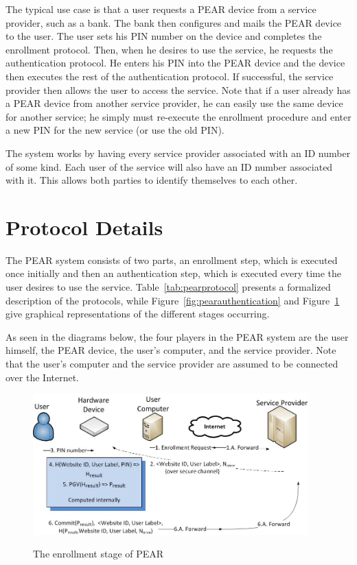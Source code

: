 The typical use case is that a user requests a PEAR device from a service provider, such as a bank. The bank then configures
and mails the PEAR device to the user. The user sets his PIN number on the device and completes the enrollment protocol.
Then, when he desires to use the service, he requests the authentication protocol. He enters his PIN into the PEAR device
and the device then executes the rest of the authentication protocol. If successful, the service provider then allows
the user to access the service. 
Note that if a user already has a PEAR device from another service provider, he can easily use the same device for another
service; he simply must re-execute the enrollment procedure and enter a new PIN for the new service (or use the old PIN).

The system works by having every service provider associated with an ID number of some kind. Each user of the service will
also have an ID number associated with it. This allows both parties to identify themselves to each other.

\section{Protocol Details}
The PEAR system consists of two parts, an enrollment step, which is executed once initially and then an authentication step,
which is executed every time the user desires to use the service.
Table~\ref{tab:pearprotocol} presents a formalized description of the protocols, while Figure~\ref{fig:pearauthentication}
and Figure~\ref{fig:pearenrollment} give graphical representations of the different stages occurring.

As seen in the diagrams below, the four players in the PEAR system are the user himself, the PEAR device, the user's computer,
and the service provider. Note that the user's computer and the service provider are assumed to be connected over the Internet.

\begin{figure}[!ht]
\includegraphics[width=400px]{images/enrollment.jpg}
\label{fig:pearenrollment}
\caption{The enrollment stage of PEAR}
\end{figure}
\FloatBarrier

